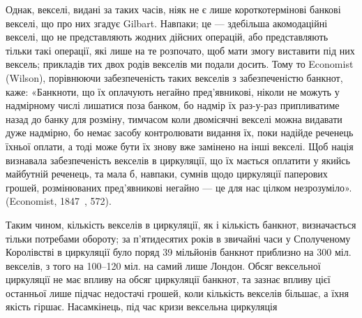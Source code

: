 Однак, векселі, видані за таких часів, ніяк не є лише короткотермінові
банкові векселі, що про них згадує Gilbart. Навпаки; це — здебільша акомодаційні
векселі, що не представляють жодних дійсних операцій, або представляють
тільки такі операції, які лише на те розпочато, щоб мати змогу виставити під них
вексель; прикладів тих двох родів векселів ми подали досить. Тому то Economist
(Wilson), порівнюючи забезпеченість таких векселів з забезпеченістю банкнот,
каже: «Банкноти, що їх оплачують негайно пред’явникові, ніколи не можуть у
надмірному числі лишатися поза банком, бо надмір їх раз-у-раз припливатиме
назад до банку для розміну, тимчасом коли двомісячні векселі можна видавати
дуже надмірно, бо немає засобу контролювати видання їх, поки надійде реченець
їхньої оплати, а тоді може бути їх знову вже замінено на інші векселі. Щоб
нація визнавала забезпеченість векселів в циркуляції, що їх мається оплатити
у якийсь майбутній реченець, та мала б, навпаки, сумнів щодо циркуляції
паперових грошей, розмінюваних пред’явникові негайно — це для нас цілком
незрозуміло». (Economist, 1847~, 572).

Таким чином, кількість векселів в циркуляції, як і кількість банкнот, визначається
тільки потребами обороту; за п’ятидесятих років в звичайні часи у
Сполученому Королівстві в циркуляції було поряд 39 мільйонів банкнот приблизно
на 300 міл. векселів, з того на 100--120 міл. на самий лише Лондон. Обсяг
вексельної циркуляції не має впливу на обсяг циркуляції банкнот, та зазнає
впливу цієї останньої лише підчас недостачі грошей, коли кількість векселів
більшає, а їхня якість гіршає. Насамкінець, під час кризи вексельна циркуляція
\parbreak{}  %
